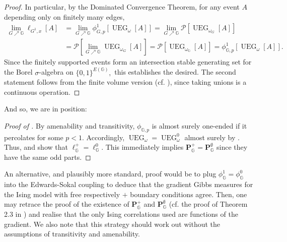 \documentclass[article,11pt,reqno]{amsart}
\newcommand{\Prbcur}{\mathbf{P}}
\begin{document}
\begin{appendix}
\begin{proof}
In particular, by the Dominated Convergence Theorem, for any event $A$ depending only on finitely many edges,
\begin{align*}
\lim_{G\nearrow \mathbb{G}}\ell_{G^1,x}[A]
&=\lim_{G\nearrow \mathbb{G}}\phi^1_{G,p}[\operatorname{UEG}_{\omega}[A]] =\lim_{G\nearrow \mathbb{G}} \mathcal{P}[\operatorname{UEG}_{\omega_G}[A]]\\
&=\mathcal{P}[\lim_{G\nearrow \mathbb{G}} \operatorname{UEG}_{\omega_G}[A]]=\mathcal{P}[\operatorname{UEG}_{\omega_{\mathbb{G}}}[A]]=\phi^1_{\mathbb{G},p}[\operatorname{UEG}_{\omega}[A]].
\end{align*}
Since the finitely supported events form an intersection stable generating set for the Borel $\sigma$-algebra on $\{0,1\}^{E(\mathbb{G})},$ this establishes the desired. The second statement follows from the finite volume version (cf. ), since taking unions is a continuous operation.
\end{proof}
And so, we are in position:

\begin{proof}[Proof of ]
By amenability and transitivity, $\phi_{\mathbb{G},p}$ is almost surely one-ended if it percolates for some $p<1$. Accordingly, $\operatorname{UEG}_{\omega}=\operatorname{UEG}_{\omega}^0$ almost surely by \cite[Lemma 3.9]{angel2021uniform}. Thus,  and   show that $\ell_\mathbb{G}^+=\ell_\mathbb{G}^0.$ This immediately implies $\Prbcur_\mathbb{G}^+=\Prbcur_\mathbb{G}^{\emptyset}$ since they have the same odd parts. 
\end{proof}

An alternative, and plausibly more standard, proof would be to plug $\phi_\mathbb{G}^1=\phi_\mathbb{G}^0$ into the Edwards-Sokal coupling to deduce that the gradient Gibbs measures for the Ising model with free respectively $+$ boundary conditions agree. Then, one may retrace the proof of the existence of $\Prbcur_\mathbb{G}^+$ and $\Prbcur_\mathbb{G}^{\emptyset}$ (cf. the proof of Theorem 2.3 in \cite{aizenman2015random}) and realise that the only Ising correlations used are functions of the gradient. We also note that this strategy should work out without the assumptions of transitivity and amenability.



\end{appendix}
\end{document}
